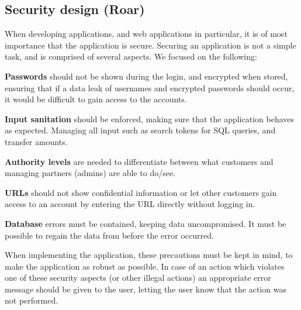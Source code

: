 \subsection{Security design (Roar)} 
\label{sec:securitydesign}

When developing applications, and web applications in particular, it is of most importance that the application is secure. Securing an application is not a simple task, and is comprised of several aspects. We focused on the following:

\textbf{Passwords} should not be shown during the login, and encrypted when stored, ensuring that if a data leak of usernames and encrypted passwords should occur, it would be difficult to gain access to the accounts.

\textbf{Input sanitation} should be enforced, making sure that the application behaves as expected. Managing all input such as search tokens for SQL queries, and transfer amounts.

\textbf{Authority levels} are needed to differentiate between what customers and managing partners (admins) are able to do/see. 

\textbf{URLs} should not show confidential information or let other customers gain access to an account by entering the URL directly without logging in.

\textbf{Database} errors must be contained, keeping data uncompromised. It must be possible to regain the data from before the error occurred. 

When implementing the application, these precautions must be kept in mind, to make the application as robust as possible. In case of an action which violates one of these security aspects (or other illegal actions) an appropriate error message should be given to the user, letting the user know that the action was not performed.